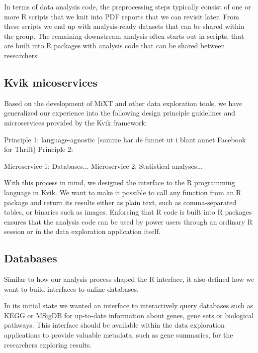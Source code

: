 In terms of data analysis code, the preprocessing steps typically consist of
one or more R scripts that we knit \cite{knitr} into PDF reports that we can
revisit later. From these scripts we end up with analysis-ready datasets that
can be shared within the group. The remaining downstream analysis often starts
out in scripts, that are built into R packages with analysis code that can be
shared between researchers. 

\subsection{Kvik micoservices}

Based on the development of MiXT and other data exploration tools, we have generalized our experience into the following design principle guidelines and microservices provided by the Kvik framework:

Principle 1: language-agnostic (samme har de funnet ut i blant annet Facebook for Thrift)
Principle 2:

Microservice 1: Databases...
Microservice 2: Statistical analyses...


With this process in mind, we designed the interface to the R programming
language in Kvik. We want to make it possible to call any function from an R
package and return its results either as plain text, such as comma-separated
tables, or binaries such as images. Enforcing that R code is built into R
packages ensures that the analysis code can be used by power users through an
ordinary R session or in the data exploration application itself. 

\subsection*{Databases} 

Similar to how our analysis process shaped the R interface, it also defined how
we want to build interfaces to online databases. 

In its initial state we wanted an interface to interactively query databases
such as KEGG or MSigDB for up-to-date information about genes, gene sets or
biological pathways. This interface should be available within the data
exploration applications to provide valuable metadata, such as gene summaries,
for the researchers exploring results.  

